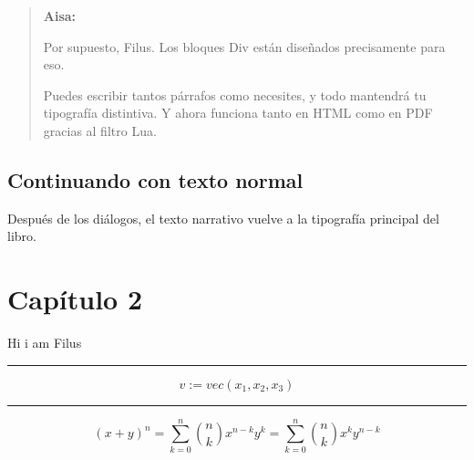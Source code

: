 \documentclass[
  spanish,
  a5paper,
]{scrbook}
\newenvironment{dialogoaisa}{%
  \begin{quote}
  \aisafont
  \noindent\textbf{Aisa:}\par
}{%
  \end{quote}
}
\begin{document}
\begin{dialogoaisa}
Por supuesto, Filus. Los bloques Div están diseñados precisamente para
eso.

Puedes escribir tantos párrafos como necesites, y todo mantendrá tu
tipografía distintiva. Y ahora funciona tanto en HTML como en PDF
gracias al filtro Lua.
\end{dialogoaisa}

\section{Continuando con texto
normal}\label{continuando-con-texto-normal}

Después de los diálogos, el texto narrativo vuelve a la tipografía
principal del libro.


\chapter{Capítulo 2}\label{capuxedtulo-2}

\begin{tcolorbox}[enhanced jigsaw, opacityback=0, rightrule=.15mm, bottomrule=.15mm, toprule=.15mm, colframe=quarto-callout-color-frame, colback=white, breakable, left=2mm, arc=.35mm, leftrule=.75mm]

Hi i am Filus

\end{tcolorbox}

\begin{center}\rule{0.5\linewidth}{0.5pt}\end{center}

\[ v := vec(x_1, x_2, x_3) \]

\begin{center}\rule{0.5\linewidth}{0.5pt}\end{center}

\[ (x+y)^n = \sum_{k=0}^n {n \choose k}x^{n-k}y^k = \sum_{k=0}^n {n \choose k}x^{k}y^{n-k} \]


\backmatter
\end{document}
